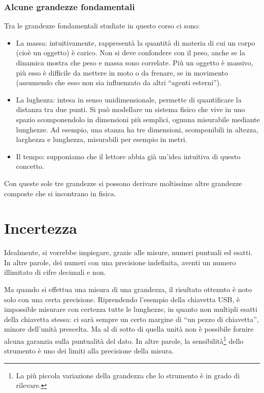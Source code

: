 \subsubsection{Alcune grandezze fondamentali}
Tra le grandezze fondamentali studiate in questo corso ci sono:
\begin{itemize}
    \item La massa: intuitivamente, rappresentà la quantità di
    materia di cui un corpo (cioè un oggetto) è carico. Non si
    deve confondere con il peso, anche se la dinamica mostra che
    peso e massa sono correlate. Più un oggetto è massivo, più
    esso è difficile da mettere in moto o da frenare, se in
    movimento (assumendo che esso non sia influenzato da altri
    ``agenti esterni'').

    \item La lughezza: intesa in senso unidimensionale, permette
    di quantificare la distanza tra due punti. Si può modellare
    un sistema fisico che vive in uno spazio scomponendolo in
    dimensioni più semplici, ognuna misurabile mediante lunghezze.
    Ad esempio, una stanza ha tre dimensioni, scomponibili in
    altezza, larghezza e lunghezza, misurabili per esempio in
    metri.

    \item Il tempo: supponiamo che il lettore abbia già un'idea
    intuitiva di questo concetto.
\end{itemize}

\noindent Con queste sole tre grandezze si possono derivare moltissime
altre grandezze composte che si incontrano in fisica.

\section{Incertezza}
Idealmente, si vorrebbe impiegare, grazie alle misure, numeri puntuali ed esatti.
In altre parole, dei numeri con una precisione indefinita, aventi un numero
illimitato di cifre decimali e non.

Ma quando si effettua una misura di una grandezza, il risultato ottenuto è noto solo
con una certa precisione. Riprendendo l'esempio della chiavetta USB, è impossible
misurare con certezza tutte le lunghezze, in quanto non multipli esatti della
chiavetta stessa: ci sarà sempre un certo margine di ``un pezzo di chiavetta'',
minore dell'unità prescelta. Ma al di sotto di quella unità non è possibile
fornire alcuna garanzia sulla puntualità del dato. In altre parole, la
sensibilità\footnote{La più piccola variazione della grandezza che lo
strumento è in grado di rilevare.} dello strumento è uno dei limiti alla precisione
della misura.

